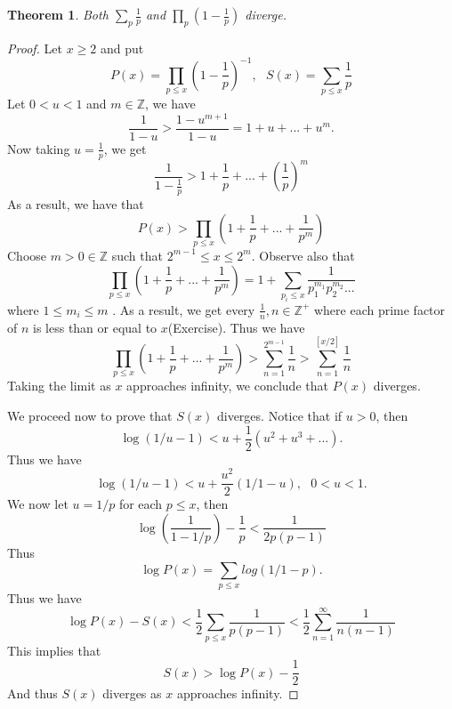 \documentclass[12pt,letterpaper]{book}
\newtheorem{theorem}{Theorem}
\begin{document}
\begin{theorem}
Both $\sum_p\frac{1}{p}$ and $\prod_p(1-\frac{1}{p})$ diverge.
\end{theorem}
\begin{proof}
Let $x \geq 2$ and put
\begin{equation*}
P(x)=\prod_{p\leq x}\left(1-\frac{1}{p}\right)^{-1}, \ \ \
S(x)=\sum_{p\leq x}\frac{1}{p}
\end{equation*}
Let $0<u<1$ and $m\in \mathbb{Z}$, we have
\begin{equation*}
\frac{1}{1-u}>\frac{1-u^{m+1}}{1-u}=1+u+...+u^m.
\end{equation*}
Now taking $u=\frac{1}{p}$, we get
\begin{equation*}
\frac{1}{1-\frac{1}{p}}>1+\frac{1}{p}+...+\left(\frac{1}{p}\right)^m
\end{equation*}
As a result, we have that
\begin{equation*}
P(x)>\prod_{p\leq x}\left(1+\frac{1}{p}+...+\frac{1}{p^m}\right)
\end{equation*}
Choose $m>0 \in \mathbb{Z}$ such that $2^{m-1}\leq x\leq 2^m$.
Observe also that
\begin{equation*}
\prod_{p\leq
x}\left(1+\frac{1}{p}+...+\frac{1}{p^m}\right)=1+\sum_{p_i\leq
x}\frac{1}{p_1^{m_1}p_2^{m_2}...}
\end{equation*}
where $1\leq m_i\leq m$ .  As a result, we get every $\frac{1}{n},
n\in \mathbb{Z^+}$ where each prime factor of $n$ is less than or
equal to $x$(Exercise). Thus we have
\begin{equation*}
\prod_{p\leq
x}\left(1+\frac{1}{p}+...+\frac{1}{p^m}\right)>\sum_{n=1}^{2^{m-1}}\frac{1}{n}>\sum_{n=1}^{[x/2]}\frac{1}{n}
\end{equation*}
Taking the limit as $x$ approaches infinity, we conclude that $P(x)$
diverges.
\par We proceed now to prove that $S(x)$ diverges.  Notice that if
$u>0$, then
\begin{equation*}
\log(1/u-1)<u+\frac{1}{2}(u^2+u^3+...).
\end{equation*}
Thus we have
\begin{equation*}
\log(1/u-1)<u+\frac{u^2}{2}(1/1-u), \ \ \ 0<u<1.
\end{equation*}
We now let $u=1/p$ for each $p\leq x$, then
\begin{equation*}
\log\left(\frac{1}{1-1/p}\right)-\frac{1}{p}<\frac{1}{2p(p-1)}
\end{equation*}
Thus
\begin{equation*}
\log P(x)=\sum_{p\leq x}log(1/1-p).
\end{equation*}
Thus we have
\begin{equation*}
\log P(x)-S(x)<\frac{1}{2}\sum_{p\leq
x}\frac{1}{p(p-1)}<\frac{1}{2}\sum_{n=1}^{\infty}\frac{1}{n(n-1)}
\end{equation*}
This implies that
\begin{equation*}
S(x)>\log  P(x)-\frac{1}{2}
\end{equation*}
And thus $S(x)$ diverges as $x$ approaches infinity.
\end{proof}
\end{document}
